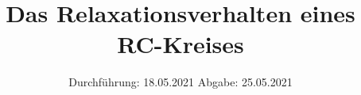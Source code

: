 

\subject{V353}
\title{Das Relaxationsverhalten eines RC-Kreises}
\date{%
  Durchführung: 18.05.2021
  \hspace{3em}
  Abgabe: 25.05.2021
}



\maketitle
\thispagestyle{empty}
\tableofcontents
\newpage







\printbibliography{}


